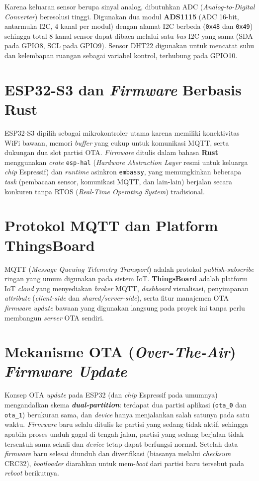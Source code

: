 \documentclass[12pt,a4paper]{report}
\begin{document}
Karena keluaran sensor berupa sinyal analog, dibutuhkan ADC (\textit{Analog-to-Digital
Converter}) beresolusi tinggi. Digunakan dua modul \textbf{ADS1115} (ADC 16-bit,
antarmuka I2C, 4 kanal per modul) dengan alamat I2C berbeda (\texttt{0x48} dan
\texttt{0x49}) sehingga total 8 kanal sensor dapat dibaca melalui satu \textit{bus} I2C yang
sama (SDA pada GPIO8, SCL pada GPIO9). Sensor DHT22 digunakan untuk mencatat suhu dan
kelembapan ruangan sebagai variabel kontrol, terhubung pada GPIO10.

\section{ESP32-S3 dan \textit{Firmware} Berbasis Rust}
ESP32-S3 dipilih sebagai mikrokontroler utama karena memiliki konektivitas WiFi
bawaan, memori \textit{buffer} yang cukup untuk komunikasi MQTT, serta dukungan dua slot
partisi OTA. \textit{Firmware} ditulis dalam bahasa \textbf{Rust} menggunakan \textit{crate}
\texttt{esp-hal} (\textit{Hardware Abstraction Layer} resmi untuk keluarga \textit{chip} Espressif) dan
\textit{runtime} asinkron \texttt{embassy}, yang memungkinkan beberapa \textit{task}
(pembacaan sensor, komunikasi MQTT, dan lain-lain) berjalan secara konkuren tanpa RTOS
(\textit{Real-Time Operating System}) tradisional.

\section{Protokol MQTT dan Platform ThingsBoard}
MQTT (\textit{Message Queuing Telemetry Transport}) adalah protokol \textit{publish-subscribe}
ringan yang umum digunakan pada sistem IoT. \textbf{ThingsBoard} adalah platform IoT
\textit{cloud} yang menyediakan \textit{broker} MQTT, \textit{dashboard} visualisasi, penyimpanan
\textit{attribute} (\textit{client-side} dan \textit{shared/server-side}), serta fitur manajemen OTA
\textit{firmware update} bawaan yang digunakan langsung pada proyek ini tanpa perlu membangun
\textit{server} OTA sendiri.

\section{Mekanisme OTA (\textit{Over-The-Air}) \textit{Firmware Update}}
Konsep OTA \textit{update} pada ESP32 (dan \textit{chip} Espressif pada umumnya) mengandalkan skema
\textbf{\textit{dual-partition}}: terdapat dua partisi aplikasi (\texttt{ota\_0} dan
\texttt{ota\_1}) berukuran sama, dan \textit{device} hanya menjalankan salah satunya pada satu
waktu. \textit{Firmware} baru selalu ditulis ke partisi yang sedang tidak aktif,
sehingga apabila proses unduh gagal di tengah jalan, partisi yang sedang berjalan
tidak tersentuh sama sekali dan \textit{device} tetap dapat berfungsi normal. Setelah data
\textit{firmware} baru selesai diunduh dan diverifikasi (biasanya melalui \textit{checksum}
CRC32), \textit{bootloader} diarahkan untuk mem-\textit{boot} dari partisi baru
tersebut pada \textit{reboot} berikutnya.
\end{document}
